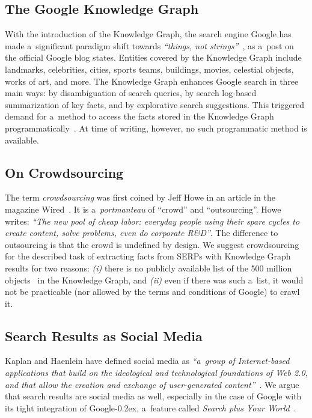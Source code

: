 \documentclass[runningheads,a4paper]{llncs}
\newcommand{\googleplus}{Google\nolinebreak\hspace{0em}\raisebox{.28ex}{\tiny\bf +}\kern-0.2ex\xspace}
\newcommand{\googleplus}{Google\nolinebreak\hspace{0em}\raisebox{.28ex}{\tiny\bf +}\kern-0.2ex\xspace}
\begin{document}
\subsection{The Google Knowledge Graph}
With the introduction of the Knowledge Graph, the search engine Google
has made a~significant paradigm shift towards \textit{``things, not strings''}~\cite{singhal2012_1},
as a~post on the official Google blog states.
Entities covered by the Knowledge Graph include landmarks, celebrities, cities, sports
teams, buildings, movies, celestial objects, works of art, and more.
The Knowledge Graph enhances Google search in three main ways:
by disambiguation of search queries,
by search log-based summarization of key facts,
and by explorative search suggestions.
This triggered demand for a~method to access
the facts stored in the Knowledge Graph programmatically~\cite{quora2012}.
At time of writing, however, no such programmatic method is available.

\subsection{On Crowdsourcing} \label{sec:on-crowdsourcing}
The term \emph{crowdsourcing} was first coined by Jeff Howe
in an article in the magazine Wired~\cite{howe2006}.
It is a~\textit{portmanteau} of ``crowd'' and ``outsourcing''.
Howe writes: \textit{``The new pool of cheap labor:
everyday people using their spare cycles to create content, solve problems,
even do corporate R\&D''}.
The difference to outsourcing is that the crowd is undefined by design.
We suggest crowdsourcing for the described task of extracting facts from
SERPs with Knowledge Graph results for two reasons:
\textit{(i)} there is no publicly available list
of the 500 million objects~\cite{singhal2012_1} in the Knowledge Graph, and
\textit{(ii)} even if there was such a~list,
it would not be practicable (nor allowed by the terms and conditions of Google)
to crawl it.

\subsection{Search Results as Social Media}
Kaplan and Haenlein have defined social media as
\textit{``a~group of Internet-based applications that build on the ideological and
technological foundations of Web 2.0, and that allow the creation and
exchange of user-generated content''}~\cite{kaplan2010}.
We argue that search results are social media as well,
especially in the case of Google with its tight integration of \googleplus,
a~feature called \emph{Search plus Your World}~\cite{singhal2012_2}.
\end{document}
